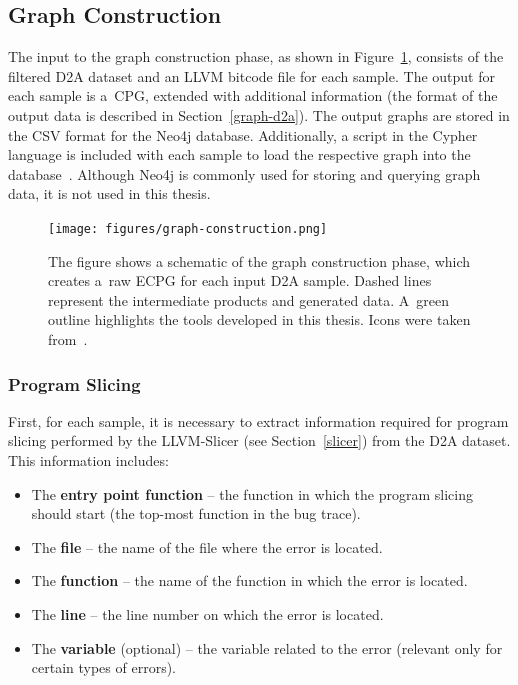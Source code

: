 \subsection{Graph Construction}
\label{graph-construction-phase}
The input to the graph construction phase, as shown in Figure~\ref{figure:graph-construction}, consists of the filtered D2A dataset and an LLVM bitcode file for each sample. The output for each sample is a~CPG, extended with additional information (the format of the output data is described in Section~\ref{graph-d2a}). The output graphs are stored in the CSV format for the Neo4j database. Additionally, a script in the Cypher language is included with each sample to load the respective graph into the database~\cite{joern-doc}. Although Neo4j is commonly used for storing and querying graph data, it is not used in this thesis.

\begin{figure}[t]
	\centering
	\texttt{[image: figures/graph-construction.png]}
	\caption{The figure shows a schematic of the graph construction phase, which creates a~raw ECPG for each input D2A sample. Dashed lines represent the intermediate products and generated data. A~green outline highlights the tools developed in this thesis. Icons were taken from~\cite{icon-ibm, icon-funnel, icon-shiftleft, icon-graph, joern-website}.}
	\label{figure:graph-construction}
\end{figure}

\subsubsection{Program Slicing}
First, for each sample, it is necessary to extract information required for program slicing performed by the LLVM-Slicer (see Section~\ref{slicer}) from the D2A dataset. This information includes:
\begin{itemize}
    \item The \textbf{entry point function} -- the function in which the program slicing should start (the top-most function in the bug trace).
    \item The \textbf{file} -- the name of the file where the error is located.
    \item The \textbf{function} -- the name of the function in which the error is located.
    \item The \textbf{line} -- the line number on which the error is located.
    \item The \textbf{variable} (optional) -- the variable related to the error (relevant only for certain types of errors).
\end{itemize}

